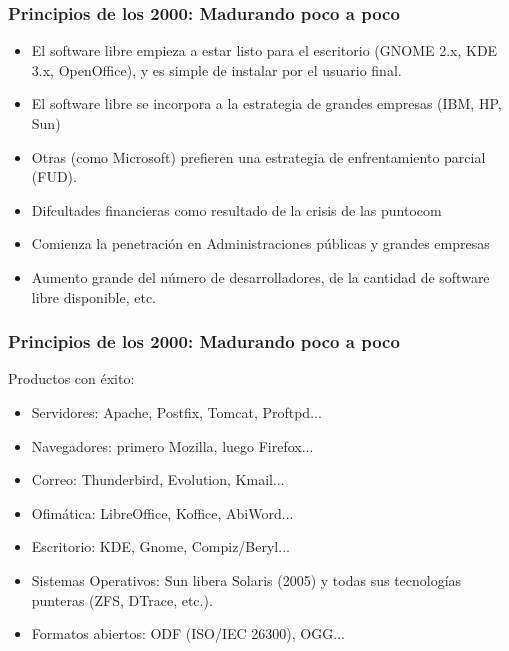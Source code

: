 \documentclass{beamer}
\begin{document}

\begin{frame}
\frametitle{Principios de los 2000: Madurando poco a poco}

\begin{itemize}
\item El software libre empieza a estar listo para el escritorio (GNOME 2.x, KDE 3.x, OpenOffice), y es simple de instalar por el usuario final.
\item El software libre se incorpora a la estrategia de grandes empresas (IBM, HP, Sun)
\item Otras (como Microsoft) prefieren una estrategia de enfrentamiento parcial (FUD).
\item Difcultades financieras como resultado de la crisis de las puntocom
\item Comienza la penetración en Administraciones públicas y grandes empresas
\item Aumento grande del número de desarrolladores, de la cantidad de software libre disponible, etc.
\end{itemize}

\end{frame}


\begin{frame}
\frametitle{Principios de los 2000: Madurando poco a poco}


Productos con éxito:
\begin{itemize}
\item Servidores: Apache, Postfix, Tomcat, Proftpd...
\item Navegadores: primero Mozilla, luego Firefox...
\item Correo: Thunderbird, Evolution, Kmail...
\item Ofimática: LibreOffice, Koffice, AbiWord...
\item Escritorio: KDE, Gnome, Compiz/Beryl...
\item Sistemas Operativos: Sun libera Solaris (2005) y todas sus tecnologías punteras (ZFS, DTrace, etc.).
\item Formatos abiertos: ODF (ISO/IEC 26300), OGG...
\end{itemize}

\end{frame}
 

\end{document}
